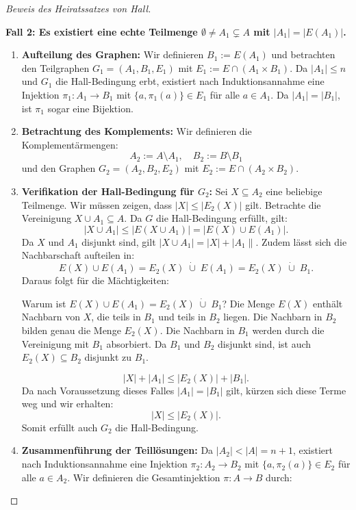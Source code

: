 \begin{proof}[Beweis des Heiratssatzes von Hall]
\begin{math-stroke}
\textbf{Fall 2: Es existiert eine echte Teilmenge $\emptyset \neq A_1 \subsetneq A$ mit $|A_1| = |E(A_1)|$.}
\begin{enumerate}[label=\textbf{(\arabic*)}]
    \item \textbf{Aufteilung des Graphen:} Wir definieren $B_1 := E(A_1)$ und betrachten den Teilgraphen $G_1 = (A_1, B_1, E_1)$ mit $E_1 := E \cap (A_1 \times B_1)$. Da $|A_1| \le n$ und $G_1$ die Hall-Bedingung erbt, existiert nach Induktionsannahme eine Injektion $\pi_1 \colon A_1 \to B_1$ mit $\{a, \pi_1(a)\} \in E_1$ für alle $a \in A_1$. Da $|A_1| = |B_1|$, ist $\pi_1$ sogar eine Bijektion.
    \item \textbf{Betrachtung des Komplements:} Wir definieren die Komplementärmengen:
    \[
    A_2 := A \setminus A_1, \quad B_2 := B \setminus B_1
    \]
    und den Graphen $G_2 = (A_2, B_2, E_2)$ mit $E_2 := E \cap (A_2 \times B_2)$.
    \item \textbf{Verifikation der Hall-Bedingung für $G_2$:} Sei $X \subseteq A_2$ eine beliebige Teilmenge. Wir müssen zeigen, dass $|X| \le |E_2(X)|$ gilt.
    Betrachte die Vereinigung $X \cup A_1 \subseteq A$. Da $G$ die Hall-Bedingung erfüllt, gilt:
    \[
    |X \cup A_1| \le |E(X \cup A_1)| = |E(X) \cup E(A_1)|.
    \]
    Da $X$ und $A_1$ disjunkt sind, gilt $|X \cup A_1| = |X| + |A_1\|$. Zudem lässt sich die Nachbarschaft aufteilen in:
    \[
    E(X) \cup E(A_1) = E_2(X) \;\dot{\cup}\; E(A_1) = E_2(X) \;\dot{\cup}\; B_1.
    \]
    Daraus folgt für die Mächtigkeiten:
    \begin{explanation-of-steps}
    Warum ist $E(X) \cup E(A_1) = E_2(X) \;\dot{\cup}\; B_1$? Die Menge $E(X)$ enthält Nachbarn von $X$, die teils in $B_1$ und teils in $B_2$ liegen. Die Nachbarn in $B_2$ bilden genau die Menge $E_2(X)$. Die Nachbarn in $B_1$ werden durch die Vereinigung mit $B_1$ absorbiert. Da $B_1$ und $B_2$ disjunkt sind, ist auch $E_2(X) \subseteq B_2$ disjunkt zu $B_1$.
    \end{explanation-of-steps}
    \[
    |X| + |A_1| \le |E_2(X)| + |B_1|.
    \]
    Da nach Voraussetzung dieses Falles $|A_1| = |B_1|$ gilt, kürzen sich diese Terme weg und wir erhalten:
    \[
    |X| \le |E_2(X)|.
    \]
    Somit erfüllt auch $G_2$ die Hall-Bedingung.
    \item \textbf{Zusammenführung der Teillösungen:} Da $|A_2| < |A| = n+1$, existiert nach Induktionsannahme eine Injektion $\pi_2 \colon A_2 \to B_2$ mit $\{a, \pi_2(a)\} \in E_2$ für alle $a \in A_2$.
    Wir definieren die Gesamtinjektion $\pi \colon A \to B$ durch:

\end{enumerate}
\end{math-stroke}
\end{proof}
